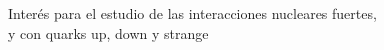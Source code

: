 \documentclass[preview]{standalone}
\begin{document}
\begin{center}
Interés para el estudio de las interacciones nucleares fuertes, \\y con quarks up, down y strange
\end{center}
\end{document}
